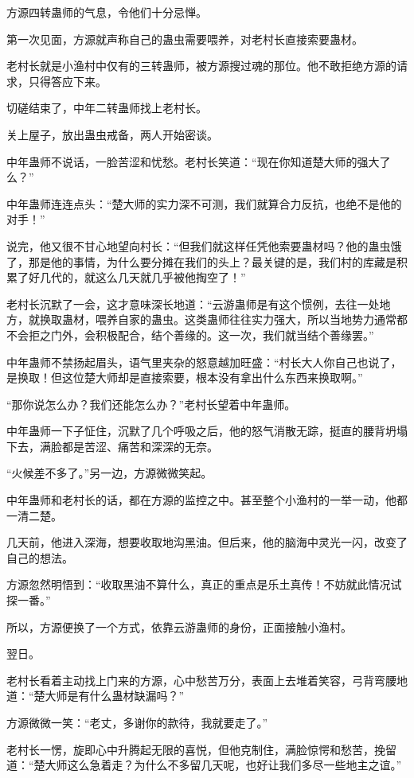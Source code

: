 \begin{this_body}
方源四转蛊师的气息，令他们十分忌惮。

第一次见面，方源就声称自己的蛊虫需要喂养，对老村长直接索要蛊材。

老村长就是小渔村中仅有的三转蛊师，被方源搜过魂的那位。他不敢拒绝方源的请求，只得答应下来。

切磋结束了，中年二转蛊师找上老村长。

关上屋子，放出蛊虫戒备，两人开始密谈。

中年蛊师不说话，一脸苦涩和忧愁。老村长笑道：“现在你知道楚大师的强大了么？”

中年蛊师连连点头：“楚大师的实力深不可测，我们就算合力反抗，也绝不是他的对手！”

说完，他又很不甘心地望向村长：“但我们就这样任凭他索要蛊材吗？他的蛊虫饿了，那是他的事情，为什么要分摊在我们的头上？最关键的是，我们村的库藏是积累了好几代的，就这么几天就几乎被他掏空了！”

老村长沉默了一会，这才意味深长地道：“云游蛊师是有这个惯例，去往一处地方，就换取蛊材，喂养自家的蛊虫。这类蛊师往往实力强大，所以当地势力通常都不会拒之门外，会积极配合，结个善缘的。这一次，我们就当结个善缘罢。”

中年蛊师不禁扬起眉头，语气里夹杂的怒意越加旺盛：“村长大人你自己也说了，是换取！但这位楚大师却是直接索要，根本没有拿出什么东西来换取啊。”

“那你说怎么办？我们还能怎么办？”老村长望着中年蛊师。

中年蛊师一下子怔住，沉默了几个呼吸之后，他的怒气消散无踪，挺直的腰背坍塌下去，满脸都是苦涩、痛苦和深深的无奈。

“火候差不多了。”另一边，方源微微笑起。

中年蛊师和老村长的话，都在方源的监控之中。甚至整个小渔村的一举一动，他都一清二楚。

几天前，他进入深海，想要收取地沟黑油。但后来，他的脑海中灵光一闪，改变了自己的想法。

方源忽然明悟到：“收取黑油不算什么，真正的重点是乐土真传！不妨就此情况试探一番。”

所以，方源便换了一个方式，依靠云游蛊师的身份，正面接触小渔村。

翌日。

老村长看着主动找上门来的方源，心中愁苦万分，表面上去堆着笑容，弓背弯腰地道：“楚大师是有什么蛊材缺漏吗？”

方源微微一笑：“老丈，多谢你的款待，我就要走了。”

老村长一愣，旋即心中升腾起无限的喜悦，但他克制住，满脸惊愕和愁苦，挽留道：“楚大师这么急着走？为什么不多留几天呢，也好让我们多尽一些地主之谊。”


\end{this_body}
